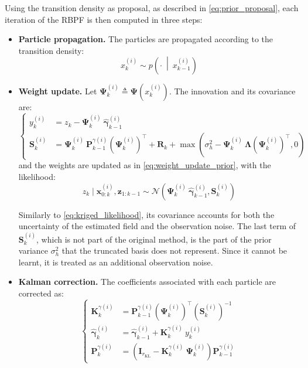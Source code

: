 Using the transition density as proposal, as described in \eqref{eq:prior_proposal}, each iteration of the RBPF is then computed in three steps:
\begin{itemize}
	\item\textbf{Particle propagation.} The particles are propagated according to the transition density:
	\begin{equation}
		x_k^{(i)}\sim p\left(\cdot\:\middle|\:x_{k-1}^{(i)}\right)
	\end{equation}
	\item\textbf{Weight update.} Let $\boldsymbol{\Psi}_k^{(i)}\triangleq\boldsymbol{\Psi}\left(x_k^{(i)}\right)$. The innovation and its covariance are:
	\begin{equation}
		\left\{\begin{aligned}
		y_k^{(i)}&=z_k-\boldsymbol{\Psi}_k^{(i)}\:\hat{\boldsymbol{\gamma}}_{k-1}^{(i)}\\
		\mathbf{S}_k^{(i)}&=\boldsymbol{\Psi}_k^{(i)}\:\mathbf{P}_{k-1}^{\gamma(i)}\left(\boldsymbol{\Psi}_k^{(i)}\right)^\top+\mathbf{R}_k+\max\left(\sigma_h^2-\boldsymbol{\Psi}_k^{(i)}\:\boldsymbol{\Lambda}\left(\boldsymbol{\Psi}_k^{(i)}\right)^\top,0\right)
		\end{aligned}\right.\label{eq:SLAM_innovation}
	\end{equation}
	and the weights are updated as in \eqref{eq:weight_update_prior}, with the likelihood:
	\begin{equation}
		z_k\mid\mathbf{x}_{0:k}^{(i)},\mathbf{z}_{1:k-1}\sim\mathcal{N}\left(\boldsymbol{\Psi}_k^{(i)}\:\hat{\boldsymbol{\gamma}}_{k-1}^{(i)},\mathbf{S}_k^{(i)}\right)
	\end{equation}

	Similarly to \eqref{eq:kriged_likelihood}, its covariance accounts for both the uncertainty of the estimated field and the observation noise. The last term of $\mathbf{S}_k^{(i)}$, which is not part of the original method, is the part of the prior variance $\sigma_h^2$ that the truncated basis does not represent. Since it cannot be learnt, it is treated as an additional observation noise.
	\item\textbf{Kalman correction.} The coefficients associated with each particle are corrected as:
	\begin{equation}
		\left\{\begin{aligned}
		\mathbf{K}_k^{\gamma(i)}&=\mathbf{P}_{k-1}^{\gamma(i)}\left(\boldsymbol{\Psi}_k^{(i)}\right)^\top\left(\mathbf{S}_k^{(i)}\right)^{-1}\\
		\hat{\boldsymbol{\gamma}}_k^{(i)}&=\hat{\boldsymbol{\gamma}}_{k-1}^{(i)}+\mathbf{K}_k^{\gamma(i)}\:y_k^{(i)}\\
		\mathbf{P}_k^{\gamma(i)}&=\left(\mathbf{I}_{r_{\mathrm{KL}}}-\mathbf{K}_k^{\gamma(i)}\:\boldsymbol{\Psi}_k^{(i)}\right)\mathbf{P}_{k-1}^{\gamma(i)}
		\end{aligned}\right.
	\end{equation}
\end{itemize}

